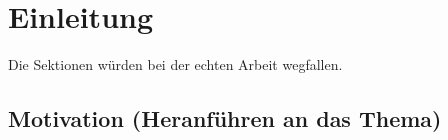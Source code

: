 \documentclass[11pt,english,ngerman, headsepline]{scrreprt}
\begin{document}
 




%
\tableofcontents{}

\pagestyle{scrheadings}    %



\chapter{Einleitung} 

Die Sektionen würden bei der echten Arbeit wegfallen.

\section{Motivation (Heranführen an das Thema)}
\end{document}
